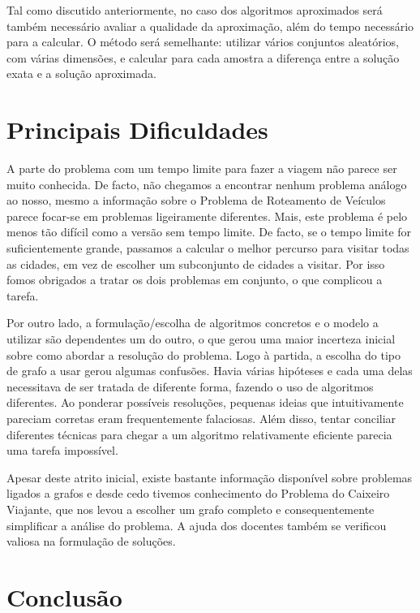 \documentclass[12pt,a4paper,reqno]{report}
\numberwithin{figure}{section}
\numberwithin{equation}{section}
\begin{document}
Tal como discutido anteriormente, no caso dos algoritmos aproximados será também necessário avaliar a qualidade da aproximação, além do tempo necessário para a calcular. O método será semelhante: utilizar vários conjuntos aleatórios, com várias dimensões, e calcular para cada amostra a diferença entre a solução exata e a solução aproximada.

\chapter{Principais Dificuldades}

A parte do problema com um tempo limite para fazer a viagem não parece ser muito conhecida. De facto, não chegamos a encontrar nenhum problema análogo ao nosso, mesmo a informação sobre o Problema de Roteamento de Veículos parece focar-se em problemas ligeiramente diferentes. Mais, este problema é pelo menos tão difícil como a versão sem tempo limite. De facto, se o tempo limite for suficientemente grande, passamos a calcular o melhor percurso para visitar todas as cidades, em vez de escolher um subconjunto de cidades a visitar. Por isso fomos obrigados a tratar os dois problemas em conjunto, o que complicou a tarefa.

Por outro lado, a formulação/escolha de algoritmos concretos e o modelo a utilizar são dependentes um do outro, o que gerou uma maior incerteza inicial sobre como abordar a resolução do problema. Logo à partida, a escolha do tipo de grafo a usar gerou algumas confusões. Havia várias hipóteses e cada uma delas necessitava de ser tratada de diferente forma, fazendo o uso de algoritmos diferentes. Ao ponderar possíveis resoluções, pequenas ideias que intuitivamente pareciam corretas eram frequentemente falaciosas. Além disso, tentar conciliar diferentes técnicas para chegar a um algoritmo relativamente eficiente parecia uma tarefa impossível.

Apesar deste atrito inicial, existe bastante informação disponível sobre problemas ligados a grafos e desde cedo tivemos conhecimento do Problema do Caixeiro Viajante, que nos levou a escolher um grafo completo e consequentemente simplificar a análise do problema. A ajuda dos docentes também se verificou valiosa na formulação de soluções.

\chapter{Conclusão}
\end{document}
